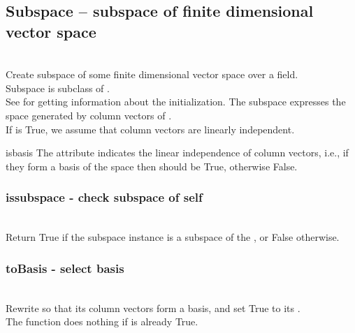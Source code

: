 \subsection{Subspace -- subspace of finite dimensional vector space}
  \\
  \spacing
  \quad Create subspace of some finite dimensional vector space over a field.\\
  \spacing
  \quad Subspace is subclass of .\\
  See  for getting information about the initialization.
  The subspace expresses the space generated by column vectors of .\\
  \spacing
  If  is True, we assume that column vectors are linearly independent.
 \begin{at}
   \item[isbasis] The attribute indicates the linear independence of column vectors, i.e., if they form a basis of the space then  should be True, otherwise False.
 \end{at}
 \method
  \subsubsection{issubspace - check subspace of self}
   \\
   \spacing
   \quad Return True if the subspace instance is a subspace of the , or False otherwise.\\
   \spacing
  \subsubsection{toBasis - select basis}
   \\
   \spacing
   \quad Rewrite  so that its column vectors form a basis, and set True to its .\\
   \spacing
   \quad The function does nothing if  is already True.\\
   \spacing
